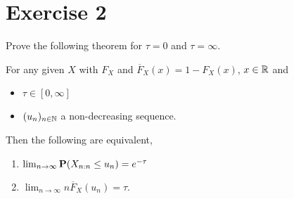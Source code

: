 \section{Exercise 2}
Prove the following theorem for $\tau = 0$ and $\tau = \infty$.

\begin{theorem}
    For any given $X$ with $F_X$ and $\overline{F}_X(x) = 1- F_X(x)$, $x\in \R$ and 
    \begin{itemize}
        \item $\tau \in [0,\infty]$
        \item $(u_n)_{n\in\N}$ a non-decreasing sequence.
    \end{itemize}
    Then the following are equivalent,
    \begin{enumerate}
        \item $\lim_{n\to\infty} \P(X_{n:n} \leq u_n) = e^{-\tau}$
        \item $\lim_{n\to\infty} n \overline{F}_X(u_n) = \tau$.
    \end{enumerate}
\end{theorem}